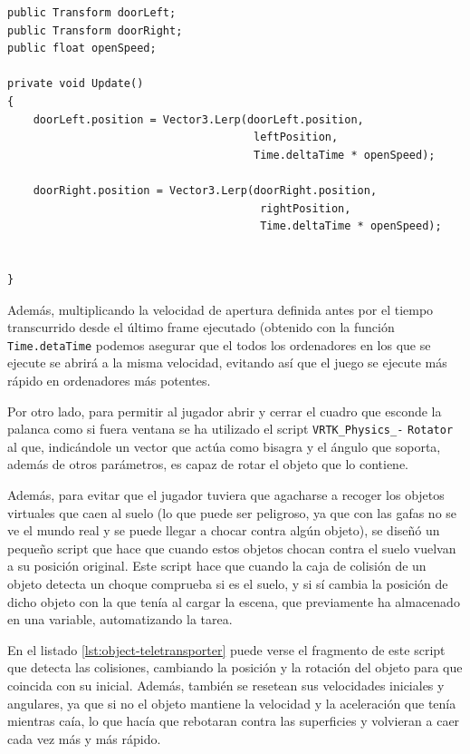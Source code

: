 \begin{lstlisting}[caption=Fragmento del script para abrir y cerrar una puerta abatible con una palanca, label=lst:lever-controller]
public Transform doorLeft;
public Transform doorRight;
public float openSpeed;

private void Update()
{
    doorLeft.position = Vector3.Lerp(doorLeft.position,
                                      leftPosition,
                                      Time.deltaTime * openSpeed);
    
    doorRight.position = Vector3.Lerp(doorRight.position,
                                       rightPosition,
                                       Time.deltaTime * openSpeed);
    

}
\end{lstlisting}

Además, multiplicando la velocidad de apertura definida antes por el tiempo transcurrido desde el último frame ejecutado (obtenido con la función \texttt{Time.detaTime} podemos asegurar que el todos los ordenadores en los que se ejecute se abrirá a la misma velocidad, evitando así que el juego se ejecute más rápido en ordenadores más potentes.

Por otro lado, para permitir al jugador abrir y cerrar el cuadro que esconde la palanca como si fuera ventana se ha utilizado el script \texttt{VRTK\_Physics\_-} \texttt{Rotator} al que, indicándole un vector que actúa como bisagra y el ángulo que soporta, además de otros parámetros, es capaz de rotar el objeto que lo contiene.

Además, para evitar que el jugador tuviera que agacharse a recoger los objetos virtuales que caen al suelo (lo que puede ser peligroso, ya que con las gafas no se ve el mundo real y se puede llegar a chocar contra algún objeto), se diseñó un pequeño script que hace que cuando estos objetos chocan contra el suelo vuelvan a su posición original. Este script hace que cuando la caja de colisión de un objeto detecta un choque comprueba si es el suelo, y si sí cambia la posición de dicho objeto con la que tenía al cargar la escena, que previamente ha almacenado en una variable, automatizando la tarea.

En el listado \ref{lst:object-teletransporter} puede verse el fragmento de este script que detecta las colisiones, cambiando la posición y la rotación del objeto para que coincida con su inicial. Además, también se resetean sus velocidades iniciales y angulares, ya que si no el objeto mantiene la velocidad y la aceleración que tenía mientras caía, lo que hacía que rebotaran contra las superficies y volvieran a caer cada vez más y más rápido.

